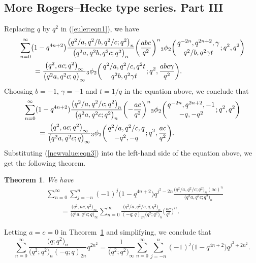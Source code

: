 \documentclass[pdftex]{sigma}
\numberwithin{equation}{section}
\newtheorem{Theorem}{Theorem}[section]
\begin{document}
\subsection{More Rogers--Hecke type series. Part III}
Replacing $q$ by $q^2$ in (\ref{euler:eqn1}), we have
\begin{align*}
	&\sum_{n=0}^\infty\bigl(1-q^{4n+2}\bigr) \frac{\bigl(q^2/a, q^2/b, q^2/c; q^2\bigr)_n}{\bigl(q^2a, q^2b, q^2c; q^2\bigr)_n} \biggl(\frac{abc}{q^2}\biggr)^n {_3\phi_2}\biggl({{q^{-2n}, q^{2n+2}, \gamma}\atop{q^2/b, q^2\gamma t}}; q^2, q^2\biggr)\nonumber\\
	&\qquad{}=\frac{\bigl(q^2, ac; q^2\bigr)_\infty}{\bigl(q^2a, q^2c; q\bigr)_\infty}
	{_3\phi_2}\biggl({{q^2/a, q^2/c, q^2t}\atop{q^2b, q^2\gamma t}}; q^2, \frac{abc\gamma}{q^2}\biggr).%
\end{align*}	
Choosing $b=-1$, $\gamma=-1$ and $t=1/q$ in the equation above, we conclude that
\begin{align*}%
& \sum_{n=0}^\infty(1-q^{4n+2}) \frac{\bigl(q^2/a, q^2/c; q^2\bigr)_n}{\bigl(q^2a, q^2c; q^2\bigr)_n} \biggl(-\frac{ac}{q^2}\biggr)^n {_3\phi_2}\biggl({{q^{-2n}, q^{2n+2}, -1}\atop{-q, -q^2}}; q^2, q^2\biggr)\\
&\qquad{}	=\frac{\bigl(q^2, ac; q^2\bigr)_\infty}{\bigl(q^2a, q^2c; q\bigr)_\infty}
	{_3\phi_2}\biggl({{q^2/a, q^2/c, q}\atop{-q^2, -q}}; q^2, \frac{ac}{q^2}\biggr).\nonumber
\end{align*}	
Substituting (\ref{newvalue:eqn3}) into the left-hand side of the equation above, we get the following theorem.
\begin{Theorem} \label{gaussthm}We have
\begin{align*}%
&\sum_{n=0}^\infty \sum_{j=-n}^n (-1)^j \bigl(1-q^{4n+2}\bigr)	q^{j^2-2n}
\frac{\bigl(q^2/a, q^2/c; q^2\bigr)_n (ac)^n}{\bigl(q^2a, q^2c; q^2\bigr)_n}\\
&\qquad{}=\frac{\bigl(q^2, ac; q^2\bigr)_\infty}{\bigl(q^2a, q^2c; q\bigr)_\infty}
\sum_{n=0}^\infty \frac{\bigl(q^2/a, q^2/c, q; q^2\bigr)_n}{(-q; q)_{2n} \bigl(q^2; q^2\bigr)_n}\biggl(\frac{ac}{q^2}\biggr)^n.
\nonumber
\end{align*}	
\end{Theorem}
Letting $a=c=0$ in Theorem~\ref{gaussthm} and simplifying, we conclude that
\begin{equation*}%
\sum_{n=0}^\infty \frac{\bigl(q; q^2\bigr)_n }{\bigl(q^2; q^2\bigr)_n (-q; q)_{2n}}q^{2n^2}
=\frac{1}{\bigl(q^2; q^2\bigr)_\infty}
\sum_{n=0}^\infty \sum_{j=-n}^n (-1)^j \bigl(1-q^{4n+2}\bigr) q^{j^2+2n^2}.
\end{equation*}
\end{document}
